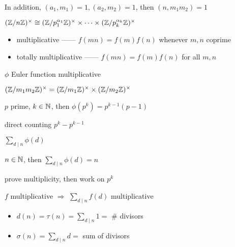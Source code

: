 \begin{cor}
    In addition, $(a_1, m_1) = 1, (a_2, m_2) = 1$, then $(n, m_1 m_2) = 1$
\end{cor}

\begin{fact}
    $(\mathbb{Z}/n\mathbb{Z})^\times \cong (\mathbb{Z}/p_1^{\alpha_1}\mathbb{Z})^\times \times \cdots \times (\mathbb{Z}/p_k^{\alpha_k}\mathbb{Z})^\times$
\end{fact}

\begin{itemize}
    \item multiplicative ------ $f(mn) = f(m)f(n)$ whenever $m, n$ coprime
    \item totally multiplicative ------ $f(mn) = f(m)f(n)$ for all $m, n$
\end{itemize}

\begin{cor}
    $\phi$ Euler function multiplicative
\end{cor}
\begin{pf}
    $(\mathbb{Z}/m_1 m_2\mathbb{Z})^\times = (\mathbb{Z}/m_1\mathbb{Z})^\times \times (\mathbb{Z}/m_2\mathbb{Z})^\times$
\end{pf}

\begin{lemma}
    $p$ prime, $k \in \mathbb{N}$, then $\phi(p^k) = p^{k-1}(p - 1)$
\end{lemma}
\begin{pf}
    direct counting $p^k - p^{k-1}$
\end{pf}

\begin{itemize}
    $\sum_{d \mid n} \phi(d)$
\end{itemize}

\begin{lemma}
    $n \in \mathbb{N}$, then $\sum_{d \mid n} \phi(d) = n$
\end{lemma}
\begin{pf}
    prove multiplicity, then work on $p^k$
\end{pf}

\begin{cor}
    $f$ multiplicative $\Rightarrow$ $\sum_{d \mid n} f(d)$ multiplicative
\end{cor}

\begin{itemize}
    \item $d(n) = \tau(n) = \sum_{d \mid n} 1 = $ \# divisors
    \item $\sigma(n) = \sum_{d \mid n} d = $ sum of divisors
\end{itemize}

